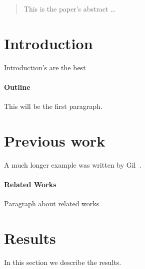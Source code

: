 \documentclass[12pt]{article}
\begin{document}
\maketitle

\begin{abstract}
This is the paper's abstract \ldots
\end{abstract}

\section{Introduction}
Introduction's are the best

\paragraph{Outline}
This will be the first paragraph.

\section{Previous work}\label{previous work}
A much longer \LaTeXe{} example was written by Gil~\cite{Gil:02}.

\paragraph{Related Works}
Paragraph about related works

\section{Results}\label{results}
In this section we describe the results.



\end{document}
